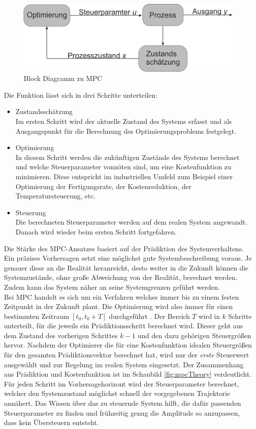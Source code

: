 \documentclass{like}
\begin{document}
  \begin{figure}[ht!]
  	\centering
  	\includegraphics[width=350pt]{Abbildungen/mpcBlockDiagram.png}
  	\caption{Block Diagramm zu MPC}
  	\label{fig:mpcBlock}
  \end{figure}

Die Funktion lässt sich in drei Schritte unterteilen:
\begin{itemize}
	\item Zustandsschätzung \\ Im ersten Schritt wird der aktuelle Zustand des Systems erfasst und als Ausgangspunkt für die Berechnung des Optimierungsproblems festgelegt.
	\item Optimierung \\ In diesem Schritt werden die zukünftigen Zustände des Systems berechnet und welche Steuerparameter vonnöten sind, um eine Kostenfunktion zu minimieren. Diese entspricht im industriellen Umfeld zum Beispiel einer Optimierung der Fertigungsrate, der Kostenreduktion,  der Temperatursteuerung, etc.
	\item Steuerung \\ Die berechneten Steuerparameter werden auf dem realen System angewandt. Danach wird wieder beim ersten Schritt fortgefahren.   
\end{itemize}


Die Stärke des \ac{MPC}-Ansatzes basiert auf der Prädiktion des Systemverhaltens. Ein präzises Vorhersagen setzt eine möglichst gute Systembeschreibung voraus. Je genauer diese an die Realität heranreicht, desto weiter in die Zukunft können die Systemzustände, ohne große Abweichung von der Realität, berechnet werden. Zudem kann das System näher an seine Systemgrenzen geführt werden. \\
Bei \ac{MPC} handelt es sich um ein Verfahren welches immer bis zu einem festen Zeitpunkt in der Zukunft plant. Die Optimierung wird also immer für einen bestimmten Zeitraum $ [t_0, t_0 + T] $ durchgeführt . Der Bereich \(T\) wird in \(k\) Schritte unterteilt, für die jeweils ein Prädiktionsschritt berechnet wird. Dieser geht aus dem Zustand des vorherigen Schrittes $k -1$ und den dazu gehörigen Steuergrößen hervor. Nachdem der Optimierer die für eine Kostenfunktion idealen Steuergrößen für den gesamten Prädiktionsvektor berechnet hat, wird nur der \emph{erste} Steuerwert ausgewählt und zur Regelung im realen System eingesetzt. Der Zusammenhang aus Prädiktion und Kostenfunktion ist im Schaubild \ref{fig:mpcTheory} verdeutlicht. Für jeden Schritt im Vorhersagehorizont wird der Steuerparameter berechnet, welcher den Systemzustand möglichst schnell der vorgegebenen Trajektorie annähert. Das Wissen über das zu steuernde System hilft, die dafür passenden Steuerparameter zu finden und frühzeitig genug die Amplitude so anzupassen, dass kein Übersteuern entsteht. 
\end{document}
